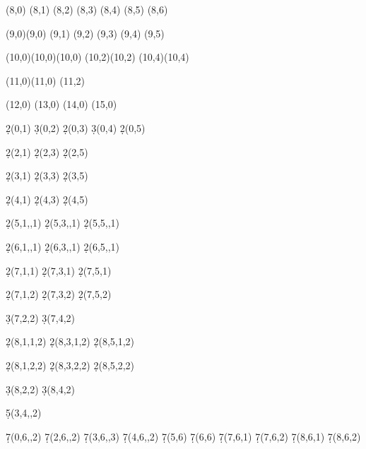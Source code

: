 \documentclass{article}
\begin{document}
\begin{sseqdata}
(8,0)
\class["\alpha d"](8,1)
\class["x d"](8,2)
\class["\alpha x d"](8,3)
\class["x^2 d"](8,4)
\class["\alpha x^2 d"](8,5)
\class["x^3 d"](8,6)

\class(9,0)\class(9,0)
\class(9,1)
\class(9,2)
\class(9,3)
\class(9,4)
\class(9,5)

\class(10,0)\class(10,0)\class(10,0)
\class(10,2)\class(10,2)
\class(10,4)\class(10,4)

\class(11,0)\class(11,0)
\class(11,2)

\class(12,0)
\class(13,0)
\class(14,0)
\class(15,0)


\d2(0,1) %
\d3(0,2) %
\d2(0,3) %
\d3(0,4) %
\d2(0,5) %


\d2(2,1) %
\d2(2,3) %
\d2(2,5) %

\d2(3,1) %
\d2(3,3)
\d2(3,5)

\d2(4,1) %
\d2(4,3)
\d2(4,5)

\d2(5,1,,1) %
\d2(5,3,,1)
\d2(5,5,,1)

\d2(6,1,,1) %
\d2(6,3,,1)
\d2(6,5,,1)

\d2(7,1,1)  %
\d2(7,3,1)
\d2(7,5,1)

\d2(7,1,2) %
\d2(7,3,2)
\d2(7,5,2)

\d3(7,2,2) %
\d3(7,4,2)

\d2(8,1,1,2) %
\d2(8,3,1,2)
\d2(8,5,1,2)

\d2(8,1,2,2) %
\d2(8,3,2,2)
\d2(8,5,2,2)

\d3(8,2,2) %
\d3(8,4,2)


\d5(3,4,,2) %

\d7(0,6,,2) %
\d7(2,6,,2)
\d7(3,6,,3)
\d7(4,6,,2)
\d7(5,6)
\d7(6,6)
\d7(7,6,1)
\d7(7,6,2)
\d7(8,6,1)
\d7(8,6,2)


\end{sseqdata}

\printpage[name=K(Z/3;2),page=2]
\newpage
\printpage[name=K(Z/3;2),page=3]
\newpage
\printpage[name=K(Z/3;2),page=5]
\newpage
\printpage[name=K(Z/3;2),page=6]
\newpage
\printpage[name=K(Z/3;2),page=7]
\newpage
\end{document}
